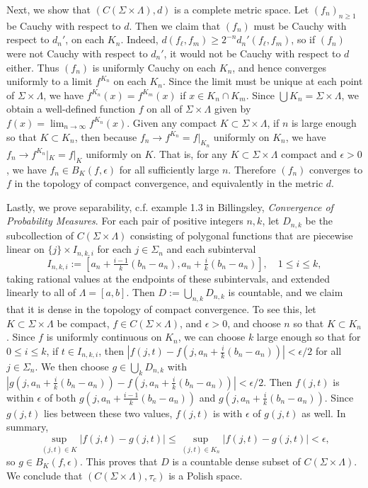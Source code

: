 \documentclass[12pt]{article}
\begin{document}
		Next, we show that $(C(\Sigma\times\Lambda), d)$ is a complete metric space. Let $(f_n)_{n\geq 1}$ be Cauchy with respect to $d$. Then we claim that $(f_n)$ must be Cauchy with respect to $d_n'$, on each $K_n$. Indeed, $d(f_\ell, f_m) \geq 2^{-n}d_n'(f_\ell, f_m)$, so if $(f_n)$ were not Cauchy with respect to $d_n'$, it would not be Cauchy with respect to $d$ either. Thus $(f_n)$ is uniformly Cauchy on each $K_n$, and hence converges uniformly to a limit $f^{K_n}$ on each $K_n$. Since the limit must be unique at each point of $\Sigma\times\Lambda$, we have $f^{K_n}(x) = f^{K_m}(x)$ if $x\in K_n\cap K_m$. Since $\bigcup K_n = \Sigma\times\Lambda$, we obtain a well-defined function $f$ on all of $\Sigma\times\Lambda$ given by $f(x)=\lim_{n\to\infty} f^{K_n}(x)$. Given any compact $K\subset \Sigma\times\Lambda$, if $n$ is large enough so that $K\subset K_n$, then because $f_n \to f^{K_n} = f|_{K_n}$ uniformly on $K_n$, we have $f_n \to f^{K_n}|_K = f|_K$ uniformly on $K$. That is, for any $K\subset\Sigma\times\Lambda$ compact and $\epsilon>0$, we have $f_n \in B_K(f,\epsilon)$ for all sufficiently large $n$. Therefore $(f_n)$ converges to $f$ in the topology of compact convergence, and equivalently in the metric $d$.
		
		Lastly, we prove separability, c.f. example 1.3 in Billingsley, \textit{Convergence of Probability Measures}. For each pair of positive integers $n,k$, let $D_{n,k}$ be the subcollection of $C(\Sigma\times\Lambda)$ consisting of polygonal functions that are piecewise linear on $\{j\}\times I_{n,k,i}$ for each $j\in\Sigma_n$ and each subinterval 
		\[
		I_{n,k,i} := [a_n+\tfrac{i-1}{k}(b_n-a_n), a_n+\tfrac{i}{k}(b_n-a_n)], \quad 1\leq i\leq k,
		\] 
		taking rational values at the endpoints of these subintervals, and extended linearly to all of $\Lambda = [a,b]$. Then $D := \bigcup_{n,k} D_{n,k}$ is countable, and we claim that it is dense in the topology of compact convergence. To see this, let $K\subset\Sigma\times\Lambda$ be compact, $f\in C(\Sigma\times\Lambda)$, and $\epsilon>0$, and choose $n$ so that $K\subset K_n$. Since $f$ is uniformly continuous on $K_n$, we can choose $k$ large enough so that for $0\leq i\leq k$, if $t\in I_{n,k,i}$, then $|f(j,t) - f(j, a_n + \frac{i}{k}(b_n-a_n))| < \epsilon/2$ for all $j\in\Sigma_n$. We then choose $g\in \bigcup_k D_{n,k}$ with $|g(j,a_n + \frac{i}{k}(b_n-a_n)) - f(j,a_n + \frac{i}{k}(b_n-a_n))| < \epsilon/2$. Then $f(j,t)$ is within $\epsilon$ of both $g(j,a_n + \frac{i-1}{k}(b_n-a_n))$ and $g(j,a_n + \frac{i}{k}(b_n-a_n))$. Since $g(j,t)$ lies between these two values, $f(j,t)$ is with $\epsilon$ of $g(j,t)$ as well. In summary,
		\[
		\sup_{(j,t)\in K} |f(j,t)-g(j,t)| \leq \sup_{(j,t)\in K_n} |f(j,t)-g(j,t)| < \epsilon,
		\] 
		so $g\in B_K(f,\epsilon)$. This proves that $D$ is a countable dense subset of $C(\Sigma\times\Lambda)$. We conclude that $(C(\Sigma\times\Lambda),\tau_c)$ is a Polish space.
		
\end{document}
